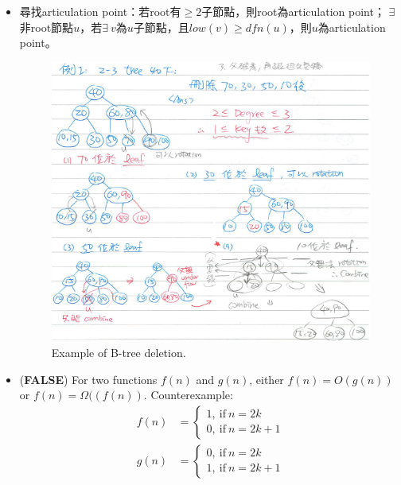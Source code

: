 \begin{itemize}
\begin{algorithm}[H]
    \end{algorithm}
    \item 尋找articulation point：若root有$\ge 2$子節點，則root為articulation point；
    $\exists$ 非root節點$u$，若$\exists \ v$為$u$子節點，且$low(v) \ge dfn(u)$，則$u$為articulation point。
    \begin{figure}[H]
        \centering
        \includegraphics[scale=1]{img/btree_del.png}
        \caption{Example of B-tree deletion.}
        \label{img:btree-del}
    \end{figure}
    \item (\textbf{FALSE}) For two functions $f(n)$ and $g(n)$, either $f(n) = O(g(n))$ or $f(n) = \Omega((f(n))$.
    Counterexample:\begin{equation}
        \begin{aligned}
            f(n) & = \begin{cases}
                1, \ \text{if} \ n = 2k \\
                0, \ \text{if} \ n = 2k + 1
            \end{cases} \\
            g(n) & = \begin{cases}
                0, \ \text{if} \ n = 2k \\
                1, \ \text{if} \ n = 2k + 1
            \end{cases} 
        \end{aligned}
    \end{equation}

\end{itemize}
